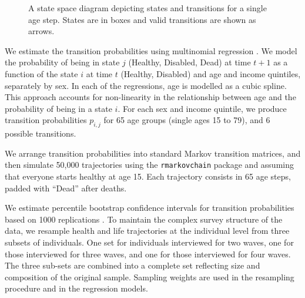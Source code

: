 \documentclass[a4paper,left=1.25cm,right=1.25cm,top=1.25cm,bottom=1.25cm]{article}
\begin{document}
\begin{figure}[t!]\centering
{}
\caption{A state space diagram depicting states and transitions for a single age step. States are in boxes and valid transitions are shown as arrows.}
\label{fig:statespace}
\end{figure}

We estimate the transition probabilities using multinomial regression \citep{Allison1982}. We model the probability of being in state $j$ (Healthy, Disabled, Dead) at time $t + 1$ as a function of the state $i$ at time $t$ (Healthy, Disabled) and age and income quintiles, separately by sex. In each of the regressions, age is modelled as a cubic spline. This approach accounts for non-linearity in the relationship between age and the probability of being in a state $i$. For each sex and income quintile, we produce transition probabilities $p_{i,j}$ for 65 age groups (single ages 15 to 79), and 6 possible transitions.

We arrange transition probabilities into standard Markov transition matrices, and then simulate 50,000 trajectories using the \texttt{rmarkovchain} package \citep{spedicato2017} and assuming that everyone starts healthy at age 15. Each trajectory consists in 65 age steps, padded with ``Dead'' after deaths. 

We estimate percentile bootstrap confidence intervals for transition probabilities based on 1000 replications \citep{Cameron2005}.
To maintain the complex survey structure of the data, we resample health and life trajectories at the individual level from three subsets of individuals. One set for individuals interviewed for two waves, one for those interviewed for three waves, and one for those interviewed for four waves. The three sub-sets are combined into a complete set reflecting size and composition of the original sample. Sampling weights are used in the resampling procedure and in the regression models.
\end{document}
